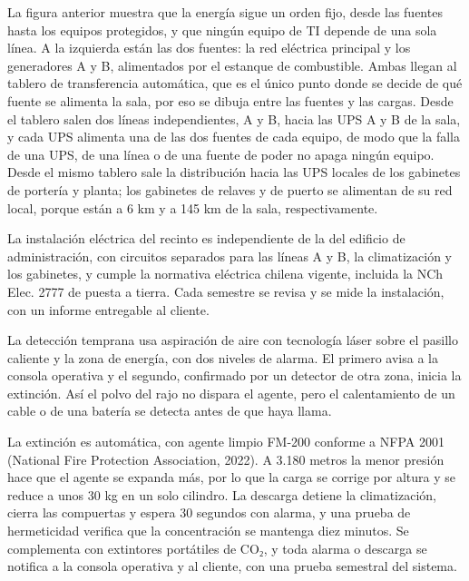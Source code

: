\documentclass[subdoc]{../../comun/overfore}
\begin{document}
\begin{horizontal}
\end{horizontal}
La figura anterior muestra que la energía sigue un orden fijo, desde las fuentes hasta los equipos protegidos, y que ningún equipo de TI depende de una sola línea. A la izquierda están las dos fuentes: la red eléctrica principal y los generadores A y B, alimentados por el estanque de combustible. Ambas llegan al tablero de transferencia automática, que es el único punto donde se decide de qué fuente se alimenta la sala, por eso se dibuja entre las fuentes y las cargas. Desde el tablero salen dos líneas independientes, A y B, hacia las UPS A y B de la sala, y cada UPS alimenta una de las dos fuentes de cada equipo, de modo que la falla de una UPS, de una línea o de una fuente de poder no apaga ningún equipo. Desde el mismo tablero sale la distribución hacia las UPS locales de los gabinetes de portería y planta; los gabinetes de relaves y de puerto se alimentan de su red local, porque están a 6 km y a 145 km de la sala, respectivamente.

La instalación eléctrica del recinto es independiente de la del edificio de administración, con circuitos separados para las líneas A y B, la climatización y los gabinetes, y cumple la normativa eléctrica chilena vigente, incluida la NCh Elec. 2777 de puesta a tierra. Cada semestre se revisa y se mide la instalación, con un informe entregable al cliente.

La detección temprana usa aspiración de aire con tecnología láser sobre el pasillo caliente y la zona de energía, con dos niveles de alarma. El primero avisa a la consola operativa y el segundo, confirmado por un detector de otra zona, inicia la extinción. Así el polvo del rajo no dispara el agente, pero el calentamiento de un cable o de una batería se detecta antes de que haya llama.

La extinción es automática, con agente limpio FM-200 conforme a NFPA 2001 (National Fire Protection Association, 2022). A 3.180 metros la menor presión hace que el agente se expanda más, por lo que la carga se corrige por altura y se reduce a unos 30 kg en un solo cilindro. La descarga detiene la climatización, cierra las compuertas y espera 30 segundos con alarma, y una prueba de hermeticidad verifica que la concentración se mantenga diez minutos. Se complementa con extintores portátiles de CO₂, y toda alarma o descarga se notifica a la consola operativa y al cliente, con una prueba semestral del sistema.
\end{document}
